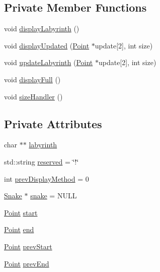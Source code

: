\subsection*{Private Member Functions}
\begin{DoxyCompactItemize}
\item 
void \hyperlink{class_labyrinth_a676e53a7bced45343af8307eae2ba2d0}{display\-Labyrinth} ()
\item 
void \hyperlink{class_labyrinth_a86210707e3b4be4faaa9bd1f86429124}{display\-Updated} (\hyperlink{common_8h_aa9cfdb80b4ca12013a2de8a3b9b97981}{Point} $\ast$update\mbox{[}2\mbox{]}, int size)
\item 
void \hyperlink{class_labyrinth_ad533aaa69e845e368a7a08097f7e4ac8}{update\-Labyrinth} (\hyperlink{common_8h_aa9cfdb80b4ca12013a2de8a3b9b97981}{Point} $\ast$update\mbox{[}2\mbox{]}, int size)
\item 
void \hyperlink{class_labyrinth_a98447444cafe6d19e0e5c0181f3c1ddd}{display\-Full} ()
\item 
void \hyperlink{class_labyrinth_a43994d3b84ed457b1c04595466a61fc6}{size\-Handler} ()
\end{DoxyCompactItemize}
\subsection*{Private Attributes}
\begin{DoxyCompactItemize}
\item 
char $\ast$$\ast$ \hyperlink{class_labyrinth_ac95a1b4246b9351e8cea8c1618bcb58d}{labyrinth}
\item 
std\-::string \hyperlink{class_labyrinth_aafa921122b2ea77268cbe479949d7d39}{reserved} = \char`\"{}!\char`\"{}
\item 
int \hyperlink{class_labyrinth_a7ddef18e25e03408485e4959bcb5aebc}{prev\-Display\-Method} = 0
\item 
\hyperlink{class_snake}{Snake} $\ast$ \hyperlink{class_labyrinth_a09a46368bfd83ccb75580687cb17b92f}{snake} = N\-U\-L\-L
\item 
\hyperlink{common_8h_aa9cfdb80b4ca12013a2de8a3b9b97981}{Point} \hyperlink{class_labyrinth_a92649fa3b24fcc869418b54e7362e24f}{start}
\item 
\hyperlink{common_8h_aa9cfdb80b4ca12013a2de8a3b9b97981}{Point} \hyperlink{class_labyrinth_a5536b8752cb3c2ef273360e14224bc6f}{end}
\item 
\hyperlink{common_8h_aa9cfdb80b4ca12013a2de8a3b9b97981}{Point} \hyperlink{class_labyrinth_a23e08d55e3a627e8a0d828d05be03253}{prev\-Start}
\item 
\hyperlink{common_8h_aa9cfdb80b4ca12013a2de8a3b9b97981}{Point} \hyperlink{class_labyrinth_a9041d96d4328dea374deb81ff08bd35c}{prev\-End}
\end{DoxyCompactItemize}


